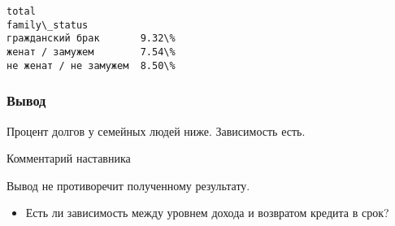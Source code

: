 \documentclass[11pt]{article}
\providecommand{\tightlist}{%
      \setlength{\itemsep}{0pt}\setlength{\parskip}{0pt}}
\newcommand{\prompt}[4]{
        \llap{{\color{#2}[#3]: #4}}\vspace{-1.25em}
    }
\begin{document}
            \begin{tcolorbox}[breakable, boxrule=.5pt, size=fbox, pad at break*=1mm, opacityfill=0]
\prompt{Out}{outcolor}{261}{\hspace{3.5pt}}
\begin{Verbatim}[commandchars=\\\{\}]
                       total
family\_status
гражданский брак       9.32\%
женат / замужем        7.54\%
не женат / не замужем  8.50\%
\end{Verbatim}
\end{tcolorbox}
        
    \hypertarget{ux432ux44bux432ux43eux434}{%
\subsubsection{Вывод}\label{ux432ux44bux432ux43eux434}}

    Процент долгов у семейных людей ниже. Зависимость есть.

    Комментарий наставника

Вывод не противоречит полученному результату.

    \begin{itemize}
\tightlist
\item
  Есть ли зависимость между уровнем дохода и возвратом кредита в срок?
\end{itemize}
\end{document}

